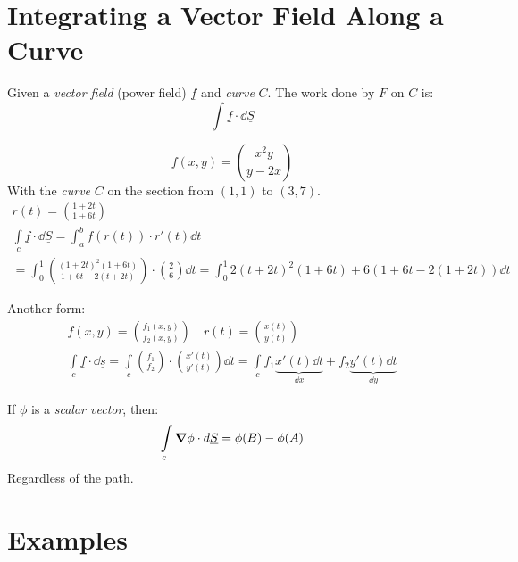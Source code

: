 \documentclass[00_complete]{subfiles}
\begin{document}
\section{Integrating a Vector Field Along a Curve}
Given a \emph{vector field} (power field) $\underline f$ and \emph{curve} $C$.
The work done by $F$ on $C$ is:
$$\int\underline f \cdot \dd{\underline S}$$
\begin{example}
    $$f(x,y)=\binom{x^2y}{y-2x}$$
    With the \emph{curve} $C$ on the section from $(1,1)$ to $(3,7)$.
    \begin{gather*}
        r(t)=\binom{1+2t}{1+6t} \\
        \int\limits_c \underline f \cdot \dd{\underline S} = \int_a^b f(r(t)) \cdot
        r'(t)\dd{t} \\
        = \int_0^1\binom{(1+2t)^2(1+6t)}{1+6t-2(t+2t)}\cdot\binom{2}{6}\dd{t}
        = \int_0^1 2(t+2t)^2(1+6t)+6(1+6t-2(1+2t))\dd{t}
    \end{gather*}
\end{example}
Another form:
\begin{gather*}
    f(x,y)=\binom{f_1(x,y)}{f_2(x,y)} \quad r(t)=\binom{x(t)}{y(t)} \\
    \int\limits_c \underline f \cdot \dd{\underline s} =
    \int\limits_c\binom{f_1}{f_2} \cdot \binom{x'(t)}{y'(t)}\dd{t} =
    \int\limits_c f_1 \underbrace{x'(t)\dd{t}}_{\dd{x}} + f_2\underbrace{y'(t)\dd{t}}_{\dd{y}}
\end{gather*}
\begin{theorem}
    If $\phi$ is a \emph{scalar vector}, then:
    $$\int\limits_c\grad \phi \cdot \dd{\underline S} = \phi(B)-\phi(A)$$
    Regardless of the path.
\end{theorem}
\section{Examples}
\end{document}
